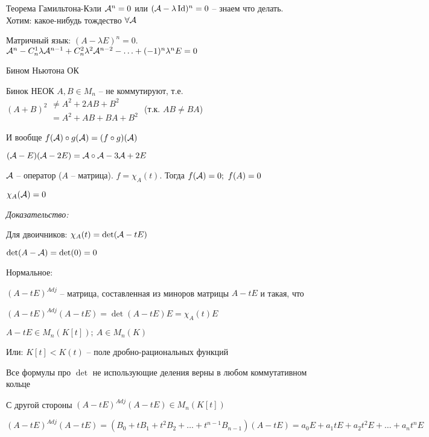 \documentclass[12pt]{article}
\begin{document}
\begin{theo}{Теорема Гамильтона-Кэли}
    $\mathcal{A}^n = 0$ или $(\mathcal{A} - \lambda \operatorname{Id})^n = 0$ -- знаем что делать. Хотим: какое-нибудь тождество $\forall \mathcal{A}$

    Матричный язык: $(A - \lambda E)^n = 0$. $\mathcal{A}^n - C_n^1\lambda\mathcal{A}^{n - 1} + C_n^2\lambda^2\mathcal{A}^{n - 2} - \ldots + (-1)^n\lambda^nE = 0$

\begin{Remark}{}
    Бином Ньютона ОК

    Бинок НЕОК $A, B \in M_n$ -- не коммутируют, т.е. $(A + B)^2 \begin{gathered}
        \neq A^2 + 2AB + B^2 \\
        = A^2 + AB + BA + B^2
    \end{gathered}$ (т.к. $AB \neq BA$)

    И вообще $f(\mathcal{A}) \circ g(\mathcal{A}) = (f \circ g)(\mathcal{A})$

    \begin{Example}{}
        $(\mathcal{A} - E)(\mathcal{A} - 2E) = \mathcal{A} \circ \mathcal{A} - 3\mathcal{A} + 2E$
    \end{Example}
\end{Remark}
    $\mathcal{A}$ -- оператор ($A$ -- матрица). $f = \chi_A(t)$. Тогда $f(\mathcal{A}) = 0;\ f(A) = 0$

    $\chi_A(\mathcal{A}) = 0$
\end{theo}

\textit{Доказательство:}

Для двоичников: $\chi_A(t) = \det(\mathcal{A} - tE)$

$\det(A - \mathcal{A}) = \det(0) = 0$

Нормальное:

\begin{Reminder}{}
    $(A - tE)^{Adj}$ -- матрица, составленная из миноров матрицы $A - tE$ и такая, что

    $(A - tE)^{Adj}(A - tE) = \det(A - tE)E = \chi_A(t)E$
\end{Reminder}

$A - tE \in M_n(K[t]);\ A \in M_n(K)$

Или: $K[t] < K(t)$ -- поле дробно-рациональных функций

Все формулы про $\det$ не использующие деления верны в любом коммутативном кольце

С другой стороны $(A - tE)^{Adj}(A - tE) \in M_n(K[t])$

$(A - tE)^{Adj}(A - tE) = (B_0 + tB_1 + t^2B_2 + \ldots + t^{n-1}B_{n-1})(A - tE) = a_0E + a_1tE + a_2t^2E + \ldots + a_nt^nE$
\end{document}
